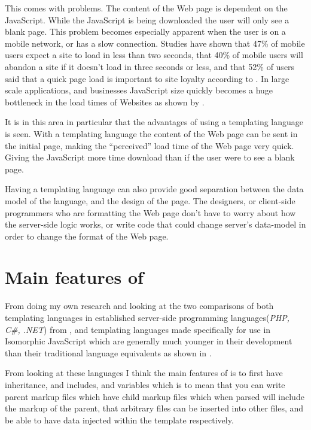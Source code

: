 This comes with problems. The content of the Web page is dependent on the JavaScript. While the JavaScript is being downloaded the user will only see a blank page. This problem becomes especially apparent when the user is on a mobile network, or has a slow connection. Studies have shown that 47\% of mobile users expect a site to load in less than two seconds, that 40\% of mobile users will abandon a site if it doesn't load in three seconds or less, and that 52\% of users said that a quick page load is important to site loyalty according to \parencite{MobileLoad}. In large scale applications, and businesses JavaScript size quickly becomes a huge bottleneck in the load times of Websites as shown by \parencite{VergeJS}.\newline

It is in this area in particular that the advantages of using a templating language is seen. With a templating language the content of the Web page can be sent in the initial  page, making the ``perceived'' load time of the Web page very quick. Giving the JavaScript more time download than if the user were to see a blank page.\newline

Having a templating language can also provide good separation between the data model of the language, and the design of the page. The designers, or client-side programmers who are formatting the Web page don't have to worry about how the server-side logic works, or write code that could change server's data-model in order to change the format of the Web page. 
\newpage
\section{Main features of \languageName{}}
From doing my own research and looking at the two comparisons of both templating languages in established server-side programming languages(\textit{PHP, C\#, .NET}) from \parencite{WikiCompare}, and templating languages made specifically for use in Isomorphic JavaScript which are generally much younger in their development than their traditional language equivalents as shown in \parencite{JSCompare}.

From looking at these languages I think the main features of \languageName{} is to first have inheritance, and includes, and variables which is to mean that you can write parent markup files which have child markup files which when parsed will include the markup of the parent, that arbitrary \languageName{} files can be inserted into other \languageName{} files, and be able to have data injected within the template respectively. 

